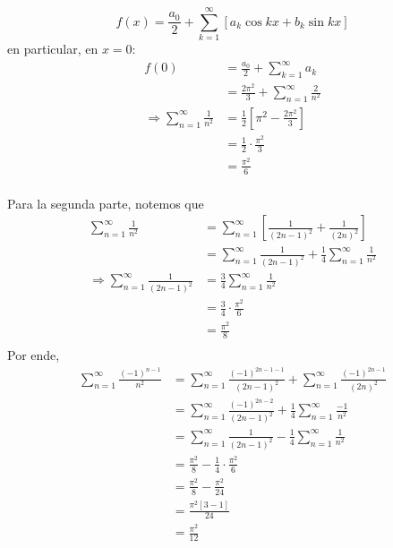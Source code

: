 \documentclass[12pt]{report}
\newcounter{it}
\theoremstyle{largebreak}
\begin{document}
\begin{sol}
        \begin{equation*}
            f(x)=\frac{a_0}{2}+\sum_{ k=1}^\infty\left[a_k\cos kx+b_k\sin kx \right]
        \end{equation*}
        en particular, en $x=0$:
        \begin{equation*}
            \begin{split}
                f(0)&=\frac{a_0}{2}+\sum_{ k=1}^\infty a_k\\
                &=\frac{2\pi^2}{3}+\sum_{ n=1}^\infty\frac{2}{n^2}\\
                \Rightarrow \sum_{ n=1}^\infty\frac{1}{n^2}&=\frac{1}{2}\left[\pi^2-\frac{2\pi^2}{3}\right] \\
                &=\frac{1}{2}\cdot\frac{\pi^2}{3}\\
                &=\frac{\pi^2}{6}\\
            \end{split}
        \end{equation*}
        
        Para la segunda parte, notemos que
        \begin{equation*}
            \begin{split}
                \sum_{ n=1}^\infty\frac{1}{n^2}&=\sum_{ n=1}^\infty\left[\frac{1}{(2n-1)^2}+\frac{1}{(2n)^2} \right]\\
                &=\sum_{ n=1}^\infty\frac{1}{(2n-1)^2}+\frac{1}{4}\sum_{ n=1}^\infty\frac{1}{n^2}\\
                \Rightarrow \sum_{ n=1}^\infty\frac{1}{(2n-1)^2}&=\frac{3}{4}\sum_{ n=1}^\infty\frac{1}{n^2}\\
                &=\frac{3}{4}\cdot\frac{\pi^2}{6}\\
                &=\frac{\pi^2}{8}\\
            \end{split}
        \end{equation*}
        Por ende,
        \begin{equation*}
            \begin{split}
                \sum_{ n=1}^\infty\frac{(-1)^{ n-1}}{n^2}&=\sum_{ n=1}^\infty\frac{(-1)^{ 2n-1-1}}{(2n-1)^2}+\sum_{ n=1}^\infty\frac{(-1)^{ 2n-1}}{(2n)^2}\\
                &=\sum_{ n=1}^\infty\frac{(-1)^{ 2n-2}}{(2n-1)^2}+\frac{1}{4}\sum_{ n=1}^\infty\frac{-1}{n^2}\\
                &=\sum_{ n=1}^\infty\frac{1}{(2n-1)^2}-\frac{1}{4}\sum_{ n=1}^\infty\frac{1}{n^2}\\
                &=\frac{\pi^2}{8}-\frac{1}{4}\cdot\frac{\pi^2}{6}\\
                &=\frac{\pi^2}{8}-\frac{\pi^2}{24}\\
                &=\frac{\pi^2\left[3-1\right]}{24}\\
                &=\frac{\pi^2}{12}\\
            \end{split}
        \end{equation*}
    \end{sol}
\end{document}
